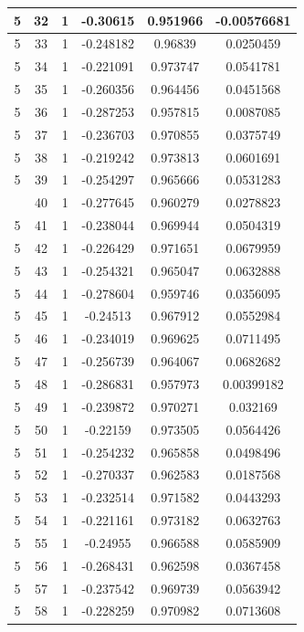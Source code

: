 \documentclass[12pt,a4paper]{article}
\numberwithin{equation}{section}
\numberwithin{figure}{section}
\numberwithin{table}{section}
\begin{document}
\begin{longtable}{|c|c|c|c|c|c|}
5 & 32 & 1 & -0.30615 & 0.951966 & -0.00576681 \\ \hline
5 & 33 & 1 & -0.248182 & 0.96839 & 0.0250459 \\ \hline
5 & 34 & 1 & -0.221091 & 0.973747 & 0.0541781 \\ \hline
5 & 35 & 1 & -0.260356 & 0.964456 & 0.0451568 \\ \hline
5 & 36 & 1 & -0.287253 & 0.957815 & 0.0087085 \\ \hline
5 & 37 & 1 & -0.236703 & 0.970855 & 0.0375749 \\ \hline
5 & 38 & 1 & -0.219242 & 0.973813 & 0.0601691 \\ \hline
5 & 39 & 1 & -0.254297 & 0.965666 & 0.0531283 \\ \hline
\pagebreak
5 & 40 & 1 & -0.277645 & 0.960279 & 0.0278823 \\ \hline
5 & 41 & 1 & -0.238044 & 0.969944 & 0.0504319 \\ \hline
5 & 42 & 1 & -0.226429 & 0.971651 & 0.0679959 \\ \hline
5 & 43 & 1 & -0.254321 & 0.965047 & 0.0632888 \\ \hline
5 & 44 & 1 & -0.278604 & 0.959746 & 0.0356095 \\ \hline
5 & 45 & 1 & -0.24513 & 0.967912 & 0.0552984 \\ \hline
5 & 46 & 1 & -0.234019 & 0.969625 & 0.0711495 \\ \hline
5 & 47 & 1 & -0.256739 & 0.964067 & 0.0682682 \\ \hline
5 & 48 & 1 & -0.286831 & 0.957973 & 0.00399182 \\ \hline
5 & 49 & 1 & -0.239872 & 0.970271 & 0.032169 \\ \hline
5 & 50 & 1 & -0.22159 & 0.973505 & 0.0564426 \\ \hline
5 & 51 & 1 & -0.254232 & 0.965858 & 0.0498496 \\ \hline
5 & 52 & 1 & -0.270337 & 0.962583 & 0.0187568 \\ \hline
5 & 53 & 1 & -0.232514 & 0.971582 & 0.0443293 \\ \hline
5 & 54 & 1 & -0.221161 & 0.973182 & 0.0632763 \\ \hline
5 & 55 & 1 & -0.24955 & 0.966588 & 0.0585909 \\ \hline
5 & 56 & 1 & -0.268431 & 0.962598 & 0.0367458 \\ \hline
5 & 57 & 1 & -0.237542 & 0.969739 & 0.0563942 \\ \hline
5 & 58 & 1 & -0.228259 & 0.970982 & 0.0713608 \\ \hline

\end{longtable}
\end{document}
